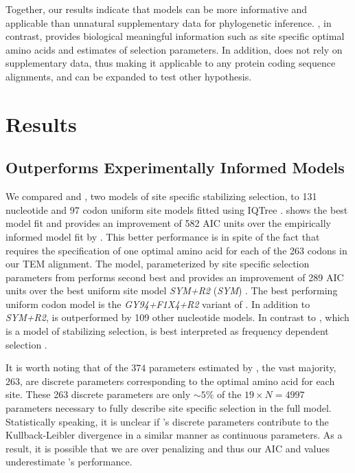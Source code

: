 \documentclass[fleqn,letterpaper]{article}
\begin{document}
Together, our results indicate that models can be more informative and applicable than unnatural supplementary data for phylogenetic inference.
\selac, in contrast, provides biological meaningful information such as site specific optimal amino acids and estimates of selection parameters.
In addition, \selac does not rely on supplementary data, thus making it applicable to any protein coding sequence alignments, and can be expanded to test other hypothesis.

\section{Results}
\subsection{\selac Outperforms Experimentally Informed Models}

We compared \selac and \phydms, two models of site specific stabilizing selection, to 131 nucleotide and 97 codon uniform site models fitted using IQTree \citep[][see Table \ref{tab:AIC_selac} for the best performing models and Table \ref{tab:AIC_full} for all models]{nguyen2015}.
\selac shows the best model fit and provides an improvement of 582 AIC units over the empirically informed model fit by \phydms.
This better performance is in spite of the fact that \selac requires the specification of one optimal amino acid for each of the 263 codons in our TEM alignment.
The \phydms model, parameterized by site specific selection parameters from \citet{stiffler2016} performs second best and provides an improvement of 289 AIC units over the best uniform site model \emph{SYM+R2} (\emph{SYM}) \citet{zharkikh1994}. 
The best performing uniform codon model is the \emph{GY94+F1X4+R2} variant of \gy. 
In addition to \emph{SYM+R2}, \gy is outperformed by 109 other nucleotide models.
In contrast to \selac, which is a model of stabilizing selection, \gy is best interpreted as frequency dependent selection \citep{HughesAndNei1988,Nowak2006,Hughes2007,beaulieu2019}.

It is worth noting that of the $374$ parameters estimated by \selac, the vast majority, $263$, are discrete parameters corresponding to the optimal amino acid for each site.
These 263 discrete parameters are only $\sim5\%$ of the $19\times N = 4997$ parameters necessary to fully describe site specific selection in the full \hb model.
Statistically speaking, it is unclear if \selac's discrete parameters contribute to the Kullback-Leibler divergence in a similar manner as continuous parameters.
As a result, it is possible that we are over penalizing \selac and thus our AIC and \DeltaAIC values underestimate \selac's performance.
\end{document}
